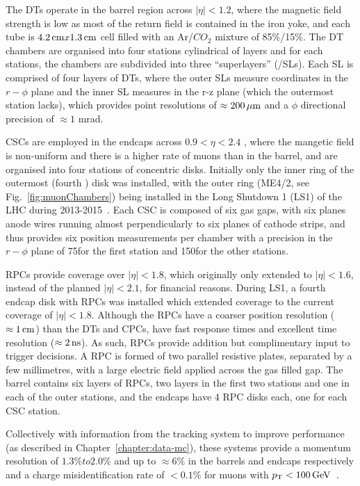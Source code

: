 The DTs operate in the barrel region across $|\eta| < 1.2$, where the magnetic field strength is low as most of the return field is contained in the iron yoke,	and each tube is $4.2\,\text{cm} x 1.3\,\text{cm}$ cell filled with an Ar/$CO_{2}$ mixture of 85\%/15\%.
The DT chambers are organised into four stations cylindrical of layers and for each stations, the chambers are subdivided into three ``superlayers'' (/SLs).
Each SL is comprised of four layers of DTs, where the outer SLs measure coordinates in the $r-\phi$ plane and the inner SL measures in the r-z plane (which the outermost station lacks), which provides point resolutions of $\approx 200\,\mu\text{m}$ and a $\phi$ directional precision of $\approx 1$ mrad.

CSCs are employed in the endcaps across $0.9 < \eta < 2.4$ , where the mangetic field is non-uniform and there is a higher rate of muons than in the barrel, and are organised into four stations of concentric disks.
Initially only the inner ring of the outermost (fourth ) disk was installed, with the outer ring (ME4/2, see Fig.~\ref{fig:muonChambers}) being installed in the Long Shutdown 1 (LS1) of the LHC during 2013-2015~\cite{Battilana:2017mrm}.
Each CSC is composed of six gas gaps, with six planes anode wires running almost perpendicularly to six planes of cathode strips, and thus provides six position measurements per chamber with a precision in the $r-\phi$ plane of 75\mum for the first station and 150\mum for the other stations\cite{CMS:1997iti}.

RPCs provide coverage over $|\eta| < 1.8$, which originally only extended to $|\eta| < 1.6$, instead of the planned $|\eta| < 2.1$, for financial reasons. 
During LS1, a fourth endcap disk with RPCs was installed which extended coverage to the current coverage of $|\eta| < 1.8$\cite{Battilana:2017mrm}.
Although the RPCs have a coarser position resolution ($\approx 1\,\text{cm}$) than the DTs and CPCs, have fast response times and excellent time resolution ($\approx 2\text{\,ns}$).
As such, RPCs provide addition but complimentary input to trigger decisions.
A RPC is formed of two parallel resistive plates, separated by a few millimetres, with a large electric field applied across the gas filled gap.
The barrel contains six layers of RPCs, two layers in the first two stations and one in each of the outer stations, and the endcaps have 4 RPC disks each, one for each CSC station.

Collectively with information from the tracking system to improve performance (as described in Chapter~\ref{chapter:data-mc}), these systems provide a momentum resolution of $1.3\% to 2.0\%$ and up to $\approx 6\%$ in the barrels and endcaps respectively and a charge misidentification rate of $< 0.1\%$ for muons with $p_{\mathrm{T}} < 100 \,\text{Ge\hspace{-.08em}V}$~\cite{Chatrchyan:2012xi,Chatrchyan:2013sba}.

